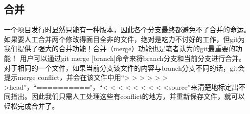 \documentclass [a4paper,11pt]{article}
\begin{document}
\subsection{合并}
一个项目发行时显然只能有一种版本，因此各个分支最终都避免不了合并的命运。如果要人工合并两个修改得面目全非的文件，绝对是吃力不讨好的工作，但git为我们提供了强大的合并功能！合并（merge）功能也是笔者认为的git最重要的功能！
用户可以通过git merge [branch]命令来将branch分支和当前分支进行合并。对于相同的一个文件，如果当前分支该文件的内容与branch分支不同的话，git会提示merge conflict，并会在该文件中用“> > > > > > >head”，“=========="，“< < < < < < < < <source”来清楚地标定出不同指出。因此我们只需人工处理这些有conflict的地方，并重新保存文件，就可以轻松完成合并了。
\end{document}
